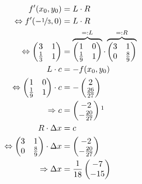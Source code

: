 \begin{align}
%
	f'(x_0,y_0)	&= L \cdot R \\
	\Leftrightarrow f'(-\nicefrac{1}{3}, 0)	&= L \cdot R \\
	\Leftrightarrow \begin{pmatrix}
		3     & 1\\
		\frac{1}{3} & 1
	\end{pmatrix}
	&=
	\overbrace{\begin{pmatrix}
		1      & 0\\
		\frac{1}{9} & 1
	\end{pmatrix}}^{=: L} \cdot 
	\overbrace{\begin{pmatrix}
		3 & 1\\
		0      & \frac{8}{9}
	\end{pmatrix}}^{=: R}\\
%
	L \cdot c	&= -f(x_0,y_0) \\
	\Leftrightarrow
	\begin{pmatrix}
		1      & 0\\
		\frac{1}{9} & 1
	\end{pmatrix}
	\cdot c
	&= -
		\begin{pmatrix}
		2\\
		\frac{26}{27}
	\end{pmatrix}\\
	\Rightarrow
	c &=		\begin{pmatrix}
		-2\\
		-\frac{20}{27}
	\end{pmatrix}\footnotemark\\
%
	R\cdot \Delta x &= c\\
	\Leftrightarrow
	\begin{pmatrix}
		3 & 1\\
		0      & \frac{8}{9}
	\end{pmatrix}
	\cdot \Delta x &=
	\begin{pmatrix}
		-2\\
		-\frac{20}{27}
	\end{pmatrix}\\
	\Rightarrow \Delta x &= \frac{1}{18}
	\begin{pmatrix}
		-7\\
		-15
	\end{pmatrix}
\end{align}

